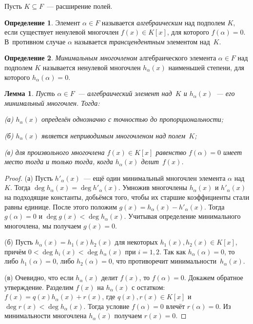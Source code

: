 \documentclass[a4paper,10pt]{amsart}
\newtheorem{lemma}{Лемма}
\theoremstyle{definition}
\newtheorem{definition}{Определение}
\theoremstyle{remark}
\begin{document}
Пусть $K\subseteq F$~--- расширение полей.

\begin{definition}
Элемент $\alpha \in F$ называется {\it алгебраическим} над подполем
$K$, если существует ненулевой многочлен $f(x)\in K[x]$, для
которого $f(\alpha) = 0$. В~противном случае $\alpha$ называется
{\it трансцендентным} элементом над~$K$.
\end{definition}

\begin{definition}
{\it Минимальным многочленом} алгебраического элемента $\alpha \in
F$ над подполем $K$ называется ненулевой многочлен $h_\alpha(x)$
наименьшей степени, для которого $h_\alpha(\alpha) = 0$.
\end{definition}

\begin{lemma} \label{lemma_min_pol}
Пусть $\alpha \in F$~--- алгебраический элемент над~$K$ и
$h_\alpha(x)$~--- его минимальный многочлен. Тогда:

\textup{(а)} $h_\alpha(x)$ определён однозначно с точностью до
пропорциональности;

\textup{(б)} $h_\alpha(x)$ является неприводимым многочленом над
полем~$K$;

\textup{(в)} для произвольного многочлена $f(x)\in K[x]$ равенство
$f(\alpha)=0$ имеет место тогда и только тогда, когда $h_\alpha(x)$
делит~$f(x)$.
\end{lemma}

\begin{proof}
(а) Пусть $h'_\alpha(x)$~--- ещё один минимальный многочлен элемента
$\alpha$ над~$K$. Тогда $\deg h_\alpha(x) = \deg h'_\alpha(x)$.
Умножив многочлены $h_\alpha(x)$ и $h'_\alpha(x)$ на подходящие
константы, добьёмся того, чтобы их старшие коэффициенты стали равны
единице. После этого положим $g(x) = h_\alpha(x) - h'_\alpha(x)$.
Тогда $g(\alpha) = 0$ и $\deg g(x) < \deg h_\alpha(x)$. Учитывая
определение минимального многочлена, мы получаем $g(x) = 0$.

(б) Пусть $h_\alpha(x) = h_1(x) h_2(x)$ для некоторых $h_1(x),
h_2(x) \in K[x]$, причём $0 < \deg h_i(x) < \deg h_\alpha(x)$ при $i
= 1,2$. Так как $h_\alpha(\alpha) = 0$, то либо $h_1(\alpha)=0$,
либо $h_2(\alpha)=0$, что противоречит минимальности~$h_\alpha(x)$.

(в) Очевидно, что если $h_\alpha(x)$ делит $f(x)$, то $f(\alpha) =
0$. Докажем обратное утверждение. Разделим $f(x)$ на $h_\alpha(x)$ с
остатком: $f(x) = q(x)h_\alpha(x) + r(x)$, где $q(x), r(x) \in K[x]$
и $\deg r(x) < \deg h_\alpha(x)$. Тогда условие $f(\alpha)=0$ влечёт
$r(\alpha) = 0$. Из минимальности многочлена $h_\alpha(x)$ получаем
$r(x)=0$.
\end{proof}
\end{document}
